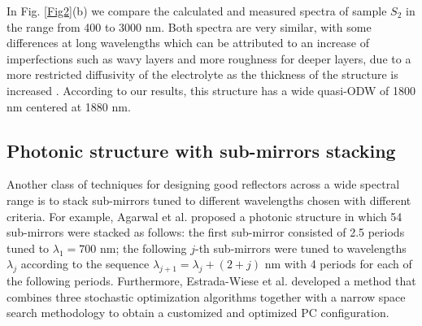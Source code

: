 \documentclass[a4paper,fleqn]{cas-sc}
\begin{document}
	In Fig. \ref{Fig2}(b) we compare the
	calculated and measured spectra of sample $S_2$ in the range
	from 400 to 3000 nm.
	Both spectra are very similar, with some differences at long
	wavelengths which can be
	attributed to an increase of imperfections such as wavy layers and
	more roughness for deeper layers, due to a more restricted diffusivity
	of the electrolyte as the thickness of the structure is increased
	\cite{Negro2003,Vincent1993}. According to our results, this
	structure has a wide quasi-ODW of 1800 nm
	centered at 1880 nm.
	
	
	
	\subsection{Photonic structure with sub-mirrors stacking}\label{ss:stacked}
	
	Another class of techniques for designing good reflectors across a wide spectral range
	is to stack sub-mirrors tuned to different wavelengths chosen with
	different criteria.
	For example, Agarwal et al. \cite{Agarwal2003} proposed a photonic
	structure in which 54 sub-mirrors were stacked as follows: the
	first sub-mirror consisted of 2.5 periods tuned to
	$\lambda_{1}=700$ nm; the following $j$-th sub-mirrors were tuned to
	wavelengths $\lambda_{j}$ according to the sequence $\lambda_{j+1}
	= \lambda_{j}+ \left(2+j \right)$ nm
	with 4 periods for
	each of the following periods.
	Furthermore, Estrada-Wiese et al. \cite{DelRio2018}
	developed a method that combines three stochastic optimization algorithms together with
	a  narrow space search methodology to obtain a customized and optimized
	PC configuration.
	
\end{document}
